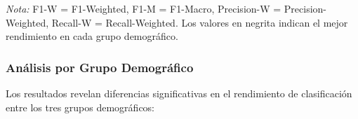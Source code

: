 \documentclass[12pt,a4paper]{article}
\begin{document}
\begin{table}[H]
\centering
\caption{Resultados de evaluación en el conjunto de test para los tres modelos en los tres grupos demográficos. Se presentan cinco métricas de clasificación: Accuracy, F1-Weighted, F1-Macro, Precision-Weighted y Recall-Weighted.}
\label{tab:comprehensive_metrics}
\begin{flushleft}
\small
\textit{Nota:} F1-W = F1-Weighted, F1-M = F1-Macro, Precision-W = Precision-Weighted, Recall-W = Recall-Weighted. Los valores en negrita indican el mejor rendimiento en cada grupo demográfico.
\end{flushleft}
\end{table}

\subsubsection{Análisis por Grupo Demográfico}

Los resultados revelan diferencias significativas en el rendimiento de clasificación entre los tres grupos demográficos:
\end{document}
